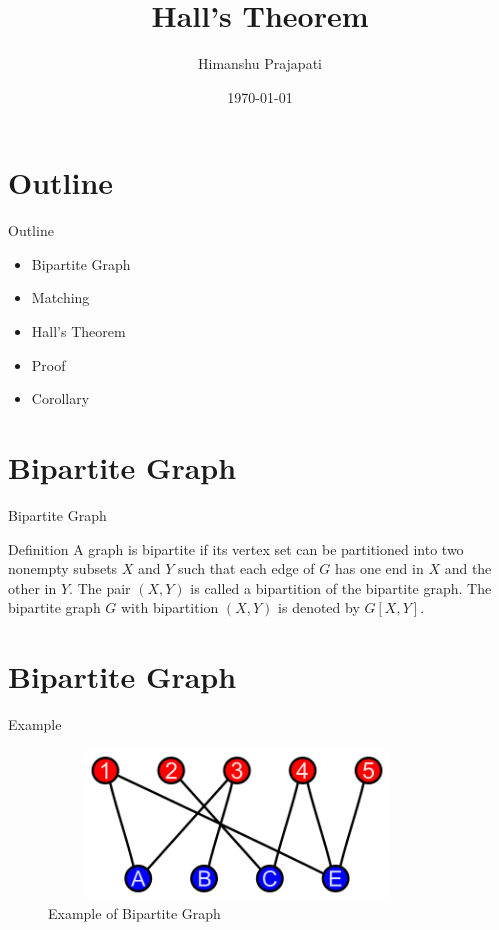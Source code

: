 \documentclass{beamer}
\title{Hall's Theorem}
\author{Himanshu Prajapati}
\institute{Indian Institute of Technology, Guwahati}
\date{\today}
\begin{document}
	
	\begin{frame}
		
		\titlepage
		
	\end{frame}
	
	\section{Outline}
	\begin{frame}{Outline}
		
		\begin{itemize}
			\item Bipartite Graph
			\item Matching
			\item Hall's Theorem
			\item Proof
			\item Corollary
			
			
		\end{itemize}
		
	\end{frame}
	
	\section{Bipartite Graph}
	\begin{frame}{Bipartite Graph}
		
		\begin{block}{Definition}
			 A graph is bipartite if its vertex set can be partitioned into two nonempty subsets $X$ and $Y$ such that each edge of $G$ has one end in $X$ and the other in $Y$. The pair $(X, Y)$ is called a bipartition of the bipartite graph. The bipartite graph $G$ with bipartition $(X, Y)$ is denoted by $G[X, Y]$.
		\end{block}
		
	\end{frame}

	\section{Bipartite Graph}
	\begin{frame}{Example}
		
	     \begin{figure}
	     	\centering
	     	\includegraphics[height=4cm,width=10cm]{Bipartite_fig.png}
	     	\caption{Example of Bipartite Graph}
	     	\label{fig1}
	     \end{figure}
		
	\end{frame}
\end{document}
